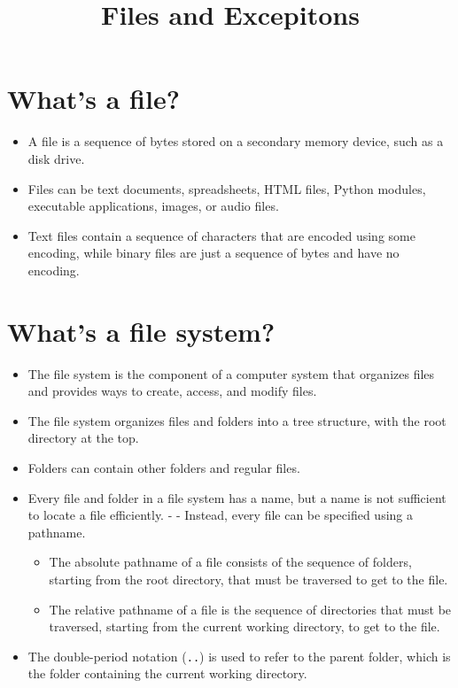 \documentclass[11pt]{article}
\title{Files and Excepitons}
\providecommand{\tightlist}{%
      \setlength{\itemsep}{0pt}\setlength{\parskip}{0pt}}
\begin{document}
    \date{}
    \maketitle
    
    

    
    \hypertarget{whats-a-file}{%
\section{What's a file?}\label{whats-a-file}}

\begin{itemize}
\tightlist
\item
  A file is a sequence of bytes stored on a secondary memory device,
  such as a disk drive.
\item
  Files can be text documents, spreadsheets, HTML files, Python modules,
  executable applications, images, or audio files.
\item
  Text files contain a sequence of characters that are encoded using
  some encoding, while binary files are just a sequence of bytes and
  have no encoding.
\end{itemize}

\hypertarget{whats-a-file-system}{%
\section{What's a file system?}\label{whats-a-file-system}}

\begin{itemize}
\tightlist
\item
  The ﬁle system is the component of a computer system that organizes
  ﬁles and provides ways to create, access, and modify ﬁles.
\item
  The file system organizes files and folders into a tree structure,
  with the root directory at the top.
\item
  Folders can contain other folders and regular files.
\item
  Every file and folder in a file system has a name, but a name is not
  sufficient to locate a file efficiently. - - Instead, every file can
  be specified using a pathname.

  \begin{itemize}
  \tightlist
  \item
    The absolute pathname of a file consists of the sequence of folders,
    starting from the root directory, that must be traversed to get to
    the file.
  \item
    The relative pathname of a file is the sequence of directories that
    must be traversed, starting from the current working directory, to
    get to the file.
  \end{itemize}
\item
  The double-period notation (\texttt{..}) is used to refer to the
  parent folder, which is the folder containing the current working
  directory.
\end{itemize}
\end{document}
